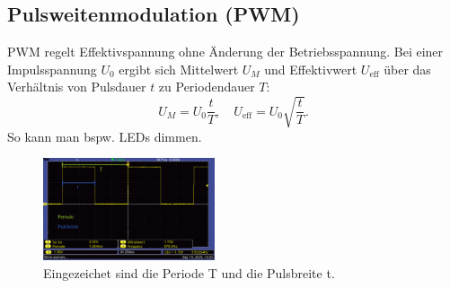 \subsection{Pulsweitenmodulation (PWM)}
PWM regelt Effektivspannung ohne Änderung der Betriebsspannung. Bei einer Impulsspannung $U_0$ ergibt sich Mittelwert $U_M$ und Effektivwert $U_\text{eff}$ über das Verhältnis von Pulsdauer $t$ zu Periodendauer $T$:
\begin{equation}
U_M = U_0 \frac{t}{T}, \quad
U_\text{eff} = U_0 \sqrt{\frac{t}{T}}.
\label{eq:spannungen}
\end{equation}
So kann man bspw. LEDs dimmen.
\begin{figure} [h!]
    \centering
        \includegraphics[width=0.45\textwidth]{img/25/PulsDef.pdf}
    \caption{Eingezeichet sind die Periode T und die Pulsbreite t.}
\end{figure}